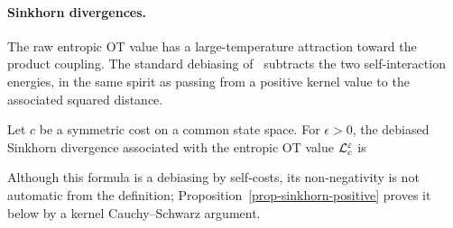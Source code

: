 \paragraph{Sinkhorn divergences.}

The raw entropic OT value has a large-temperature attraction toward the product coupling. The standard debiasing of~\cite{feydy2018interpolating} subtracts the two self-interaction energies, in the same spirit as passing from a positive kernel value to the associated squared distance.

\begin{defn}\label{def-sinkhorn-divergence}
	Let $c$ be a symmetric cost on a common state space. For $\epsilon>0$, the debiased Sinkhorn divergence associated with the entropic OT value $\mathcal{L}_c^\varepsilon$ is
\end{defn}
Although this formula is a debiasing by self-costs, its non-negativity is not automatic from the definition; Proposition~\ref{prop-sinkhorn-positive} proves it below by a kernel Cauchy--Schwarz argument.


